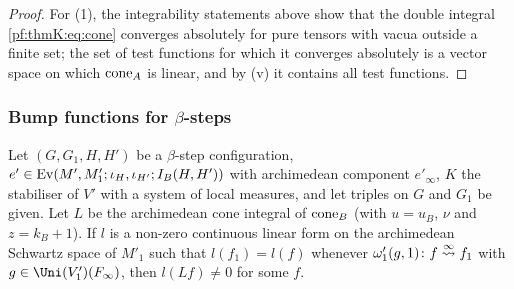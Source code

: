 \begin{proof}
For (1), the integrability statements above show that the double integral \eqref{pf:thmK:eq:cone} converges absolutely for
pure tensors with vacua outside a finite set; the set of test functions for which it converges absolutely is a vector
space on which $\operatorname{cone}_A$ is linear, and by (v) it contains all test functions.
\end{proof}

\subsubsection{Bump functions for $\beta$-steps}\label{sec:pf:thmK:bumpb}

\begin{lemma}\label{pf:thmK:bumpb}
Let $(G,G_1,H,H')$ be a $\beta$-step configuration, $e'\in\operatorname{Ev}(M',M'_1;\iota_H,\iota_{H'};I_B(H,H'))$ with archimedean
component $e'_\infty$, $K$ the stabiliser of $V'$ with a system of local measures, and let triples on $G$ and $G_1$ be
given. Let $L$ be the archimedean cone integral of $\operatorname{cone}_B$ (with $u=u_B$, $\nu$ and $z=k_B+1$). If $l$ is a non-zero
continuous linear form on the archimedean Schwartz space of $M'_1$ such that $l(f_1)=l(f)$ whenever
$\omega'_1(g,1)\colon f\mathrel{\stackrel{\infty}{\leadsto}}f_1$ with $g\in\Uni(V'_1)(F_\infty)$, then $l(Lf)\ne0$ for some $f$.
\end{lemma}

